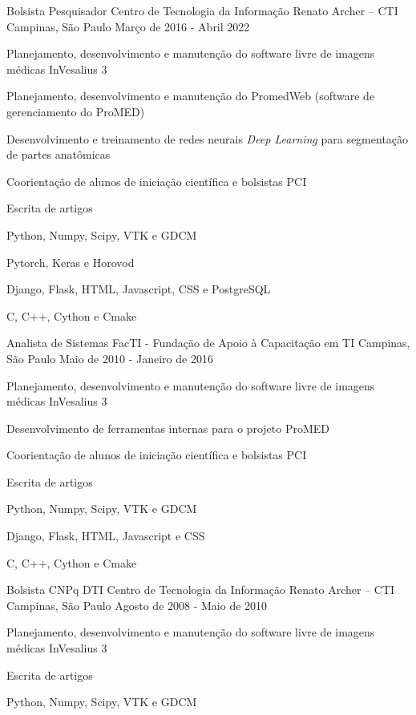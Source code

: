 \begin{cventries}

  \cventry
    {Bolsista Pesquisador}
    {Centro de Tecnologia da Informação Renato Archer – CTI}
    {Campinas, São Paulo}
    {Março de 2016 - Abril 2022}
    {
      \begin{cvitems}
      \item {Planejamento, desenvolvimento e manutenção do software livre de imagens médicas InVesalius 3}
      \item {Planejamento, desenvolvimento e manutenção do PromedWeb (software de gerenciamento do ProMED)}
      \item {Desenvolvimento e treinamento de redes neurais \textit{Deep Learning} para segmentação de partes anatômicas}
      \item {Coorientação de alunos de iniciação científica e bolsistas PCI}
      \item {Escrita de artigos}
      \item {Python, Numpy, Scipy, VTK e GDCM}
      \item {Pytorch, Keras e Horovod}
      \item {Django, Flask, HTML, Javascript, CSS e PostgreSQL}
      \item {C, C++, Cython e Cmake}
      \end{cvitems}
    }

  \cventry
  {Analista de Sistemas}
  {FacTI - Fundação de Apoio à Capacitação em TI}
  {Campinas, São Paulo}
  {Maio de 2010 - Janeiro de 2016}
  {
    \begin{cvitems}
      \item {Planejamento, desenvolvimento e manutenção do software livre de imagens médicas InVesalius 3}
      \item {Desenvolvimento de ferramentas internas para o projeto ProMED}
      \item {Coorientação de alunos de iniciação científica e bolsistas PCI}
      \item {Escrita de artigos}
      \item {Python, Numpy, Scipy, VTK e GDCM}
      \item {Django, Flask, HTML, Javascript e CSS}
      \item {C, C++, Cython e Cmake}
      \end{cvitems}
    }

    \cventry
    {Bolsista CNPq DTI}
    {Centro de Tecnologia da Informação Renato Archer – CTI}
    {Campinas, São Paulo}
    {Agosto de 2008 - Maio de 2010}
    {
      \begin{cvitems}
      \item {Planejamento, desenvolvimento e manutenção do software livre de imagens médicas InVesalius 3}
      \item {Escrita de artigos}
      \item {Python, Numpy, Scipy, VTK e GDCM}
      \end{cvitems}
    }


\end{cventries}
